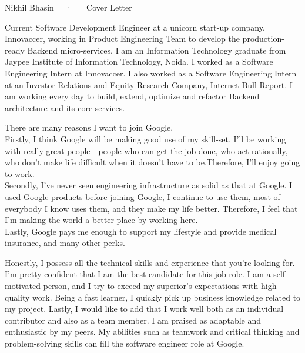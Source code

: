 \documentclass[11pt, a4paper]{awesome-cv}
\begin{document}
\makecvheader[R]

\makecvfooter
  {}
  {Nikhil Bhasin ~~·~~~ Cover Letter}
  {}

\makelettertitle

\begin{cvletter}

Current Software Development Engineer at a unicorn start-up company, Innovaccer, working in Product Engineering Team to develop the production-ready Backend micro-services. I am an Information Technology graduate from Jaypee Institute of Information Technology, Noida. I worked as a Software Engineering Intern at Innovaccer. I also worked as a Software Engineering Intern at an Investor Relations and Equity Research Company, Internet Bull Report. I am working every day to build, extend, optimize and refactor Backend architecture and its core services.


There are many reasons I want to join Google. \\
Firstly, I think Google will be making good use of my skill-set. I’ll be working with really great people - people who can get the job done, who act rationally, who don’t make life difficult when it doesn’t have to be.Therefore, I'll enjoy going to work. 
\\
Secondly, I’ve never seen engineering infrastructure as solid as that at Google. I used Google products before joining Google, I continue to use them, most of everybody I know uses them, and they make my life better. Therefore, I feel that I’m making the world a better place by working here.
\\
Lastly, Google pays me enough to support my lifestyle and provide medical insurance, and many other perks. 

Honestly, I possess all the technical skills and experience that you’re looking for. I’m pretty confident that I am the best candidate for this job role. I am a self-motivated person, and I try to exceed my superior’s expectations with high-quality work. Being a fast learner, I quickly pick up business knowledge related to my project. Lastly, I would like to add that I work well both as an individual contributor and also as a team member. I am praised as adaptable and enthusiastic by my peers. My abilities such as teamwork and critical thinking and problem-solving skills can fill the software engineer role at Google.

\end{cvletter}


\makeletterclosing
\end{document}
